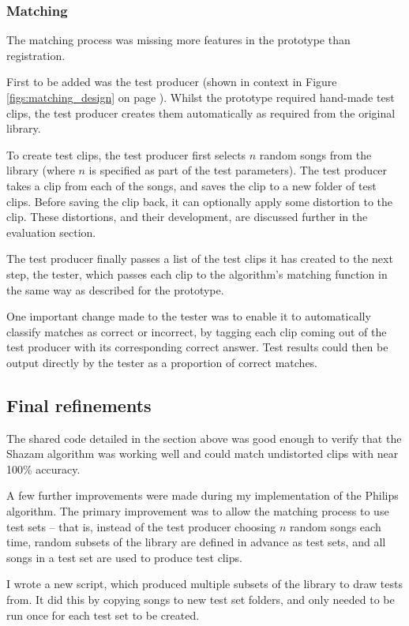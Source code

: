 \documentclass[12pt,a4paper,twoside,openright]{report}
\begin{document}
\subsubsection{Matching}

The matching process was missing more features in the prototype than registration.

First to be added was the test producer (shown in context in Figure \ref{figs:matching_design} on page \pageref{figs:matching_design}). Whilst the prototype required hand-made test clips, the test producer creates them automatically as required from the original library.

To create test clips, the test producer first selects $n$ random songs from the library (where $n$ is specified as part of the test parameters). The test producer takes a clip from each of the songs, and saves the clip to a new folder of test clips. Before saving the clip back, it can optionally apply some distortion to the clip. These distortions, and their development, are discussed further in the evaluation section. %

The test producer finally passes a list of the test clips it has created to the next step, the tester, which passes each clip to the algorithm's matching function in the same way as described for the prototype.

One important change made to the tester was to enable it to automatically classify matches as correct or incorrect, by tagging each clip coming out of the test producer with its corresponding correct answer. Test results could then be output directly by the tester as a proportion of correct matches.


\subsection{Final refinements}

The shared code detailed in the section above was good enough to verify that the Shazam algorithm was working well and could match undistorted clips with near 100\% accuracy.

A few further improvements were made during my implementation of the Philips algorithm. The primary improvement was to allow the matching process to use test sets -- that is, instead of the test producer choosing $n$ random songs each time, random subsets of the library are defined in advance as test sets, and all songs in a test set are used to produce test clips.

I wrote a new script, which produced multiple subsets of the library to draw tests from. It did this by copying songs to new test set folders, and only needed to be run once for each test set to be created. 
\end{document}
